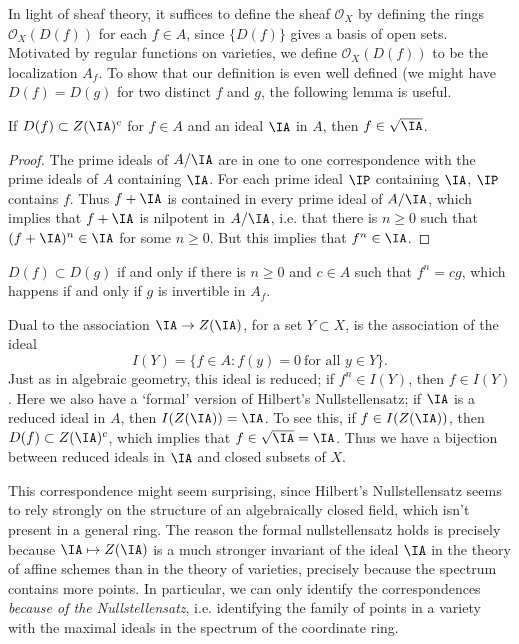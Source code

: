 In light of sheaf theory, it suffices to define the sheaf $\mathcal{O}_X$ by defining the rings $\mathcal{O}_X(D(f))$ for each $f \in A$, since $\{ D(f) \}$ gives a basis of open sets. Motivated by regular functions on varieties, we define $\mathcal{O}_X(D(f))$ to be the localization $A_f$. To show that our definition is even well defined (we might have $D(f) = D(g)$ for two distinct $f$ and $g$, the following lemma is useful.

\begin{lemma}
    If $D(f) \subset Z(\IA)^c$ for $f \in A$ and an ideal $\IA$ in $A$, then $f \in \sqrt{\IA}$.
\end{lemma}
\begin{proof}
    The prime ideals of $A/\IA$ are in one to one correspondence with the prime ideals of $A$ containing $\IA$. For each prime ideal $\IP$ containing $\IA$, $\IP$ contains $f$. Thus $f + \IA$ is contained in every prime ideal of $A/\IA$, which implies that $f + \IA$ is nilpotent in $A/\IA$, i.e. that there is $n \geq 0$ such that $(f + \IA)^n \in \IA$ for some $n \geq 0$. But this implies that $f^n \in \IA$.
\end{proof}

\begin{corollary}
    $D(f) \subset D(g)$ if and only if there is $n \geq 0$ and $c \in A$ such that $f^n = cg$, which happens if and only if $g$ is invertible in $A_f$.
\end{corollary}

\begin{remark}
    Dual to the association $\IA \to Z(\IA)$, for a set $Y \subset X$, is the association of the ideal
    \[ I(Y) = \{ f \in A: f(y) = 0\ \text{for all $y \in Y$} \}. \]
    Just as in algebraic geometry, this ideal is reduced; if $f^n \in I(Y)$, then $f \in I(Y)$. Here we also have a `formal' version of Hilbert's Nullstellensatz; if $\IA$ is a reduced ideal in $A$, then $I(Z(\IA)) = \IA$. To see this, if $f \in I(Z(\IA))$, then $D(f) \subset Z(\IA)^c$, which implies that $f \in \sqrt{\IA} = \IA$. Thus we have a bijection between reduced ideals in $\IA$ and closed subsets of $X$.

    This correspondence might seem surprising, since Hilbert's Nullstellensatz seems to rely strongly on the structure of an algebraically closed field, which isn't present in a general ring. The reason the formal nullstellensatz holds is precisely because $\IA \mapsto Z(\IA)$ is a much stronger invariant of the ideal $\IA$ in the theory of affine schemes than in the theory of varieties, precisely because the spectrum contains more points. In particular, we can only identify the correspondences \emph{because of the Nullstellensatz}, i.e. identifying the family of points in a variety with the maximal ideals in the spectrum of the coordinate ring.
\end{remark}


